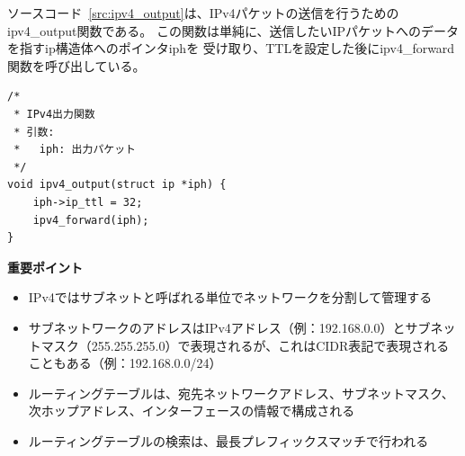 ソースコード~\ref{src:ipv4_output}は、IPv4パケットの送信を行うための
ipv4\_output関数である。
この関数は単純に、送信したいIPパケットへのデータを指すip構造体へのポインタiphを
受け取り、TTLを設定した後にipv4\_forward関数を呼び出している。

\begin{lstlisting}[caption=ipv4\_output関数,label=src:ipv4_output]
/*
 * IPv4出力関数
 * 引数:
 *   iph: 出力パケット
 */
void ipv4_output(struct ip *iph) {
    iph->ip_ttl = 32;
    ipv4_forward(iph);
}
\end{lstlisting}

\begin{itembox}[l]{\bf 重要ポイント}
    \begin{itemize}
        \item IPv4ではサブネットと呼ばれる単位でネットワークを分割して管理する
        \item サブネットワークのアドレスはIPv4アドレス（例：192.168.0.0）とサブネットマスク（255.255.255.0）で表現されるが、これはCIDR表記で表現されることもある（例：192.168.0.0/24）
        \item ルーティングテーブルは、宛先ネットワークアドレス、サブネットマスク、次ホップアドレス、インターフェースの情報で構成される
        \item ルーティングテーブルの検索は、最長プレフィックスマッチで行われる
    \end{itemize}
\end{itembox}





